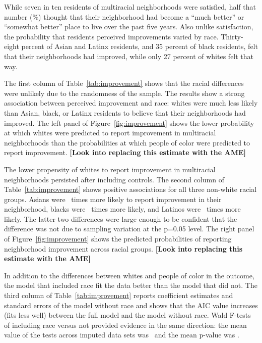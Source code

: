 \documentclass{baderart}
\begin{document}
While seven in ten residents of multiracial neighborhoods were satisfied, half that number (\meanimproved \%) thought that their neighborhood had become a ``much better'' or ``somewhat better'' place to live over the past five years. Also unlike satisfaction, the probability that residents perceived improvements varied by race. Thirty-eight percent of Asian and Latinx residents, and 35 percent of black residents, felt that their neighborhoods had improved, while only 27 percent of whites felt that way.

The first column of Table~\ref{tab:improvement} shows that the racial differences were unlikely due to the randomness of the sample. The results show a strong association between perceived improvement and race: whites were much less likely than Asian, black, or Latinx residents to believe that their neighborhoods had improved. The left panel of Figure~\ref{fig:improvement} shows the lower probability at which whites were predicted to report improvement in multiracial neighborhoods than the probabilities at which people of color were predicted to report improvement. \textbf{{[}Look into replacing this estimate with the AME{]}}


The lower propensity of whites to report improvement in multiracial neighborhoods persisted after including controls. The second column of Table~\ref{tab:improvement} shows positive associations for all three non-white racial groups. Asians were \apibetter~times more likely to report improvement in their neighborhood, blacks were \nhbbetter~times more likely, and Latinos were \hspbetter~times more likely. The latter two differences were large enough to be confident that the difference was not due to sampling variation at the p=0.05 level. The right panel of Figure~\ref{fig:improvement} shows the predicted probabilities of reporting neighborhood improvement across racial groups. \textbf{{[}Look into replacing this estimate with the AME{]}}


In addition to the differences between whites and people of color in the outcome, the model that included race fit the data better than the model that did not. The third column of Table~\ref{tab:improvement} reports coefficient estimates and standard errors of the model without race and shows that the AIC value increases (fits less well) between the full model and the model without race. Wald F-tests of including race versus not provided evidence in the same direction: the mean value of the tests across imputed data sets was \betWaldF~and the mean p-value was \betWaldp.
\end{document}
